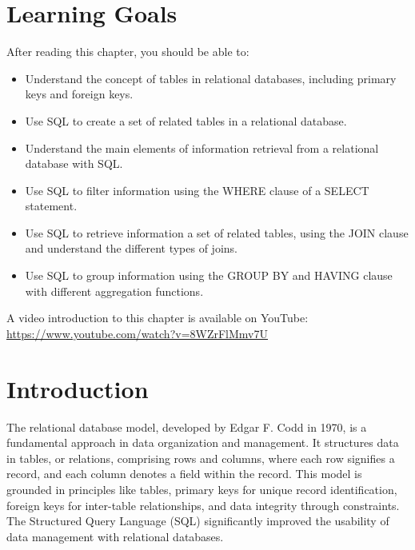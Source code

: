 %
%
\section*{Learning Goals}

After reading this chapter, you should be able to:
\begin{itemize}
   \item Understand the concept of tables in relational databases, including primary keys and foreign keys.
   \item Use SQL to create a set of related tables in a relational database.
   \item Understand the main elements of information retrieval from a relational database with SQL.
   \item Use SQL to filter information using the WHERE clause of a SELECT statement.
   \item Use SQL to retrieve information a set of related tables, using the JOIN clause and understand the different types of joins.
   \item Use SQL to group information using the GROUP BY and HAVING clause with different aggregation functions.
\end{itemize}

\begin{advanced}
\begin{videobox}
A video introduction to this chapter is available on YouTube:\\

\url{https://www.youtube.com/watch?v=8WZrFlMmv7U}
\end{videobox}
\end{advanced}


\section{Introduction}

The relational database model, developed by Edgar F. Codd in 1970, is a fundamental approach in data organization and management. It structures data in tables, or relations, comprising rows and columns, where each row signifies a record, and each column denotes a field within the record. This model is grounded in principles like tables, primary keys for unique record identification, foreign keys for inter-table relationships, and data integrity through constraints. The Structured Query Language (SQL) significantly improved the usability of data management with relational databases.

